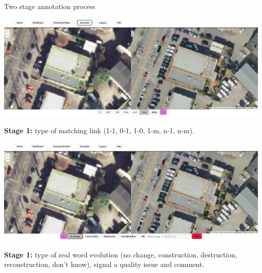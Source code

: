 \documentclass{beamer}
\begin{document}
\begin{frame}{Two stage annotation process}



\footnotesize

\begin{center}
  \includegraphics[width=0.65\linewidth]{figures/example_dortmund_nochange_stage1.png}
\end{center}

\textbf{Stage 1:} type of matching link (1-1, 0-1, 1-0, 1-m, n-1, n-m).

\smallskip

\begin{center}
  \includegraphics[width=0.65\linewidth]{figures/example_dortmund_nochange_stage2.png}
\end{center}

\textbf{Stage 1:} type of real word evolution (no change, construction, destruction, reconstruction, don't know), signal a quality issue and comment.



\end{frame}
\end{document}
